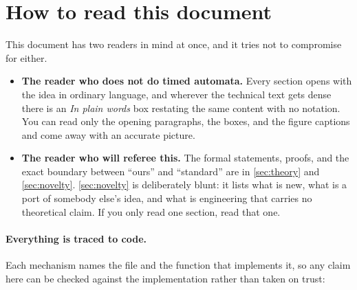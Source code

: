 \section*{How to read this document}

This document has two readers in mind at once, and it tries not to compromise
for either.

\begin{itemize}[leftmargin=1.2em, itemsep=2pt]
\item \textbf{The reader who does not do timed automata.}  Every section opens
      with the idea in ordinary language, and wherever the technical text gets
      dense there is an \emph{In plain words} box restating the same content
      with no notation.  You can read only the opening paragraphs, the boxes,
      and the figure captions and come away with an accurate picture.

\item \textbf{The reader who will referee this.}  The formal statements,
      proofs, and the exact boundary between ``ours'' and ``standard'' are in
      \cref{sec:theory} and \cref{sec:novelty}.  \cref{sec:novelty} is
      deliberately blunt: it lists what is new, what is a port of somebody
      else's idea, and what is engineering that carries no theoretical claim.
      If you only read one section, read that one.
\end{itemize}

\paragraph{Everything is traced to code.}
Each mechanism names the file and the function that implements it, so any
claim here can be checked against the implementation rather than taken on
trust:

